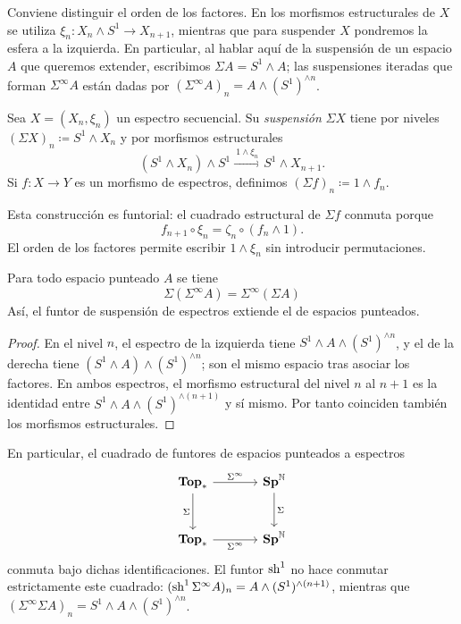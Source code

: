 Conviene distinguir el orden de los factores. En los morfismos estructurales de $X$ se utiliza $\xi_n\colon X_n\wedge S^1\to X_{n+1}$, mientras que para suspender $X$ pondremos la esfera a la izquierda. En particular, al hablar aquí de la suspensión de un espacio $A$ que queremos extender, escribimos $\Sigma A=S^1\wedge A$; las suspensiones iteradas que forman $\Sigma^\infty A$ están dadas por $(\Sigma^\infty A)_n=A\wedge(S^1)^{\wedge n}$.

\begin{defi}\label{defi:suspension-espectro}
Sea $X=(X_n,\xi_n)$ un espectro secuencial. Su \emph{suspensión} $\Sigma X$ tiene por niveles $(\Sigma X)_n\coloneqq S^1\wedge X_n$ y por morfismos estructurales
\[
(S^1\wedge X_n)\wedge S^1\xrightarrow{\ 1\wedge\xi_n\ }S^1\wedge X_{n+1}.
\]
Si $f\colon X\to Y$ es un morfismo de espectros, definimos $(\Sigma f)_n\coloneqq 1\wedge f_n$.
\end{defi}

Esta construcción es funtorial: el cuadrado estructural de $\Sigma f$ conmuta porque
\[
f_{n+1}\circ\xi_n=\zeta_n\circ(f_n\wedge1).
\]
 El orden de los factores permite escribir $1\wedge\xi_n$ sin introducir permutaciones.

\begin{prop}\label{prop:suspension-extiende}
Para todo espacio punteado $A$ se tiene
\[
\Sigma(\Sigma^\infty A)=\Sigma^\infty(\Sigma A)
\]
Así, el funtor de suspensión de espectros extiende el de espacios punteados.
\end{prop}
\begin{proof}
En el nivel $n$, el espectro de la izquierda tiene $S^1\wedge A\wedge(S^1)^{\wedge n}$, y el de la derecha tiene $(S^1\wedge A)\wedge(S^1)^{\wedge n}$; son el mismo espacio tras asociar los factores. En ambos espectros, el morfismo estructural del nivel $n$ al $n+1$ es la identidad entre $S^1\wedge A\wedge(S^1)^{\wedge(n+1)}$ y sí mismo. Por tanto coinciden también los morfismos estructurales.
\end{proof}

En particular, el cuadrado de funtores de espacios punteados a espectros
\[
\begin{tikzcd}[column sep=large,row sep=large]
\Topstar \arrow[r,"\Sigma^\infty"] \arrow[d,"\Sigma"'] & \Sp^{\mathbb N} \arrow[d,"\Sigma"] \\
\Topstar \arrow[r,"\Sigma^\infty"'] & \Sp^{\mathbb N}
\end{tikzcd}
\]
conmuta bajo dichas identificaciones. El funtor $\operatorname{sh}^1$ no hace conmutar estrictamente este cuadrado: $(\operatorname{sh}^1\Sigma^\infty A)_n=A\wedge(S^1)^{\wedge(n+1)}$, mientras que $(\Sigma^\infty\Sigma A)_n=S^1\wedge A\wedge(S^1)^{\wedge n}$.

